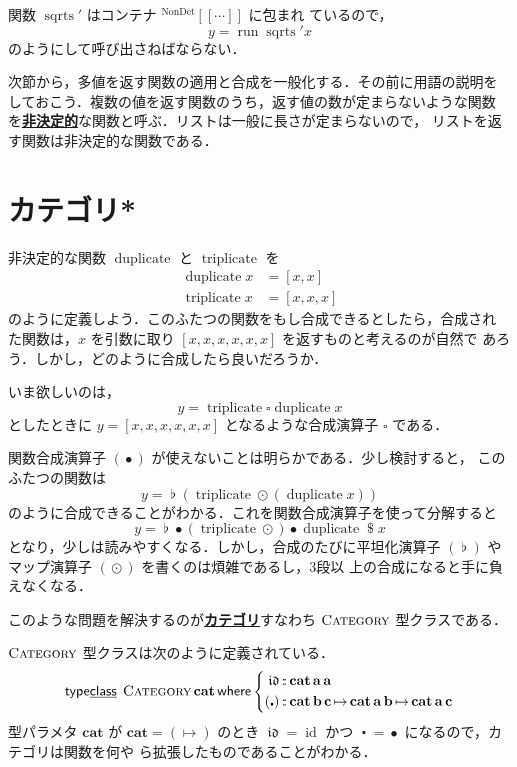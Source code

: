 \documentclass[a5paper,twoside,fleqn,draft]{jsbook}
\def\[{\left[\!\left[}
\def\]{\right]\!\right]}
\newcommand{\keyword}[1]{{\underline{\textbf{#1}}}}
\newcommand{\mKeyword}[1]{\mathsf{#1}} %
\newcommand{\mKeywordUnderline}[1]{\text{\underline{\textsf{#1}}}} %
\newcommand{\mTypeClassKeyword}{\mKeyword{type}\mKeywordUnderline{class}}
\newcommand{\mWhereKeyword}{\mKeyword{where}}
\DeclareMathOperator{\mTypeClass}{\mTypeClassKeyword}
\DeclareMathOperator{\mWhere}{\mWhereKeyword}
\newcommand{\mSpecialFunc}[1]{\mathrm{#1}}
\DeclareMathOperator{\mDuplicate}{\mSpecialFunc{duplicate}}
\DeclareMathOperator{\mRun}{\mSpecialFunc{run}}
\DeclareMathOperator{\mSqrts}{\mSpecialFunc{sqrts}}
\DeclareMathOperator{\mTriplicate}{\mSpecialFunc{triplicate}}
\DeclareMathOperator{\mId}{id}
\DeclareMathOperator{\mIdCat}{\mathfrak{id}}
\DeclareMathOperator{\mApply}{\$}
\DeclareMathOperator{\mComp}{\bullet} %
\DeclareMathOperator{\mCompCat}{\centerdot}
\DeclareMathOperator{\mConcat}{\flat}
\DeclareMathOperator{\mIn}{{:\!:}}
\DeclareMathOperator{\mMapList}{\odot}
\DeclareMathOperator{\mMapsTo}{\mapsto}
\newcommand{\mType}[1]{\mathbf{#1}}
\newcommand{\mA}{\mType{a}}
\newcommand{\mB}{\mType{b}}
\newcommand{\mC}{\mType{c}}
\newcommand{\mValueConstructor}[1]{\mathrm{#1}}
\newcommand{\mGenericValueAssemble}[2]{{}^\mValueConstructor{#1}\[#2\]}
\newcommand{\mGenericTypeClass}[1]{\textsc{#1}} %
\newcommand{\mCategoryTypeClass}{\mGenericTypeClass{Category}}
\begin{document}
関数 $\mSqrts'$ はコンテナ $\mGenericValueAssemble{NonDet}{\dotsb}$ に包まれ
ているので，
\begin{equation}
  y=\mRun\mSqrts' x
\end{equation}
のようにして呼び出さねばならない．

次節から，多値を返す関数の適用と合成を一般化する．その前に用語の説明を
しておこう．複数の値を返す関数のうち，返す値の数が定まらないような関数
を\keyword{非決定的}な関数と呼ぶ．リストは一般に長さが定まらないので，
リストを返す関数は非決定的な関数である．

\section{カテゴリ*}

非決定的な関数 $\mDuplicate$ と $\mTriplicate$ を
\begin{align}
  \mDuplicate x&=[x,x]\\
  \mTriplicate x&=[x,x,x]
\end{align}
のように定義しよう．このふたつの関数をもし合成できるとしたら，合成され
た関数は，$x$ を引数に取り $[x,x,x,x,x,x]$ を返すものと考えるのが自然で
あろう．しかし，どのように合成したら良いだろうか．

いま欲しいのは，
\begin{equation}
  y=\mTriplicate\square\mDuplicate x
\end{equation}
としたときに $y=[x,x,x,x,x,x]$ となるような合成演算子 $\square$ である．

関数合成演算子 $(\mComp)$ が使えないことは明らかである．少し検討すると，
このふたつの関数は
\begin{equation}
  y=\mConcat(\mTriplicate\mMapList(\mDuplicate x))
\end{equation}
のように合成できることがわかる．これを関数合成演算子を使って分解すると
\begin{equation}
  \label{eq:triplicate-duplicate}
  y=\mConcat\mComp(\mTriplicate\mMapList)\mComp\mDuplicate\mApply x
\end{equation}
となり，少しは読みやすくなる．しかし，合成のたびに平坦化演算子
$(\mConcat)$ やマップ演算子 $(\mMapList)$ を書くのは煩雑であるし，3段以
上の合成になると手に負えなくなる．

このような問題を解決するのが\keyword{カテゴリ}すなわち
$\mCategoryTypeClass$ 型クラスである．

$\mCategoryTypeClass$ 型クラスは次のように定義されている．
\begin{equation}
  \mTypeClass\;
  \mCategoryTypeClass\,\mType{cat}
  \mWhere\left\{
  \begin{aligned}
    \mIdCat&\mIn\mType{cat}\,\mA\,\mA\\
    (\mCompCat)&\mIn\mType{cat}\,\mB\,\mC
    \mMapsTo\mType{cat}\,\mA\,\mB
    \mMapsTo\mType{cat}\,\mA\,\mC
  \end{aligned}
  \right.
\end{equation}
型パラメタ $\mType{cat}$ が $\mType{cat}=(\mMapsTo)$ のとき
$\mIdCat=\mId$ かつ $\mCompCat=\mComp$ になるので，カテゴリは関数を何や
ら拡張したものであることがわかる．
\end{document}
